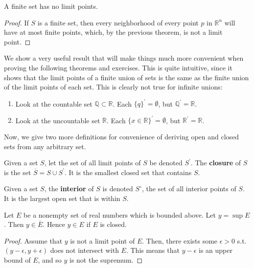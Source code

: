 \documentclass{article}
\begin{document}
    \begin{corollary}
      A finite set has no limit points. 
    \end{corollary}
    \begin{proof}
      If $S$ is a finite set, then every neighborhood of every point $p$ in $\mathbb{R}^n$ will have at most finite points, which, by the previous theorem, is not a limit point. 
    \end{proof}

    We show a very useful result that will make things much more convenient when proving the following theorems and exercises. This is quite intuitive, since it shows that the limit points of a finite union of sets is the same as the finite union of the limit points of each set. This is clearly not true for infinite unions: 
    \begin{enumerate}
      \item Look at the countable set $\mathbb{Q} \subset \mathbb{R}$. Each $\{q\}^\prime = \emptyset$, but $\mathbb{Q}^\prime = \mathbb{R}$. 
      \item Look at the uncountable set $\mathbb{R}$. Each $\{x \in \mathbb{R}\}^\prime = \emptyset$, but $\mathbb{R}^\prime = \mathbb{R}$. 
    \end{enumerate}

    Now, we give two more definitions for convenience of deriving open and closed sets from any arbitrary set. 

    \begin{definition}[Closure]
      Given a set $S$, let the set of all limit points of $S$ be denoted $S^\prime$. The \textbf{closure} of $S$ is the set $\overline{S} = S \cup S^\prime$. It is the smallest closed set that contains $S$. 
    \end{definition}

    \begin{definition}[Interior]
      Given a set $S$, the \textbf{interior} of $S$ is denoted $S^\circ$, the set of all interior points of $S$. It is the largest open set that is within $S$. 
    \end{definition}

    \begin{theorem}
      Let $E$ be a nonempty set of real numbers which is bounded above. Let $y = \sup{E}$. Then $y \in \overline{E}$. Hence $y \in E$ if $E$ is closed. 
    \end{theorem}
    \begin{proof}
      Assume that $y$ is not a limit point of $E$. Then, there exists some $\epsilon > 0$ s.t. $(y - \epsilon, y + \epsilon)$ does not intersect with $E$. This means that $y - \epsilon$ is an upper bound of $E$, and so $y$ is not the supremum. 
    \end{proof}
\end{document}
